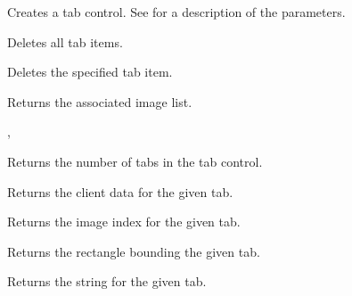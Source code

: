 Creates a tab control. See  for a description
of the parameters.

\label{wxtabctrldeleteallitems}


Deletes all tab items.

\label{wxtabctrldeleteitem}


Deletes the specified tab item.

\label{wxtabctrlgetimagelist}


Returns the associated image list.


, 

\label{wxtabctrlgetitemcount}


Returns the number of tabs in the tab control.

\label{wxtabctrlgetitemdata}


Returns the client data for the given tab.

\label{wxtabctrlgetitemimage}


Returns the image index for the given tab.

\label{wxtabctrlgetitemrect}


Returns the rectangle bounding the given tab.



\label{wxtabctrlgetitemtext}


Returns the string for the given tab.

